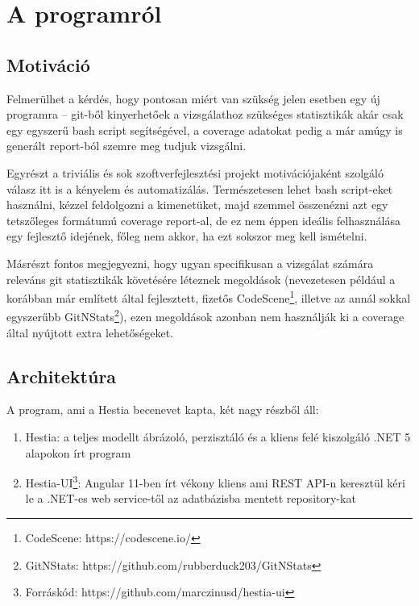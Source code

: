 \chapter{A programról}
\label{ch:about_hestia}

\section{Motiváció}

Felmerülhet a kérdés, hogy pontosan miért van szükség jelen esetben egy új programra -- git-ből kinyerhetőek a vizsgálathoz szükséges statisztikák akár csak egy egyszerű bash script segítségével, a coverage adatokat pedig a már amúgy is generált report-ból szemre meg tudjuk vizsgálni.

Egyrészt a triviális és sok szoftverfejlesztési projekt motivációjaként szolgáló válasz itt is a kényelem és automatizálás. Természetesen lehet bash script-eket használni, kézzel feldolgozni a kimenetüket, majd szemmel összenézni azt egy tetszőleges formátumú coverage report-al, de ez nem éppen ideális felhasználása egy fejlesztő idejének, főleg nem akkor, ha ezt sokszor meg kell ismételni.

Másrészt fontos megjegyezni, hogy ugyan specifikusan a vizsgálat számára releváns git statisztikák követésére léteznek megoldások (nevezetesen például a korábban már említett \citeauthor{tornhillXrays} által fejlesztett, fizetős CodeScene\footnote{CodeScene: https://codescene.io/}, illetve az annál sokkal egyszerűbb GitNStats\footnote{GitNStats: https://github.com/rubberduck203/GitNStats}), ezen megoldások azonban nem használják ki a coverage által nyújtott extra lehetőségeket.

\section{Architektúra}

A program, ami a Hestia becenevet kapta, két nagy részből áll:
\begin{enumerate}
    \item Hestia: a teljes modellt ábrázoló, perzisztáló és a kliens felé kiszolgáló .NET 5 alapokon írt program
    \item Hestia-UI\footnote{Forráskód: https://github.com/marczinusd/hestia-ui}: Angular 11-ben írt vékony kliens ami REST API-n keresztül kéri le a .NET-es web service-től az adatbázisba mentett repository-kat
\end{enumerate}

